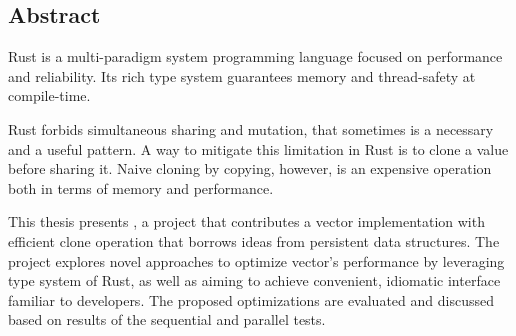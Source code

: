 \vspace*{2cm}
\thispagestyle{plain}

{}

\begin{center}
\section*{Abstract}
\end{center}

Rust is a multi-paradigm system programming language focused on performance and reliability. Its rich type system guarantees memory and thread-safety at compile-time.

Rust forbids simultaneous sharing and mutation, that sometimes is a necessary and a useful pattern. A way to mitigate this limitation in Rust is to clone a value before sharing it. Naive cloning by copying, however, is an expensive operation both in terms of memory and performance.

This thesis presents \pvecrs{}, a project that contributes a vector implementation with efficient clone operation that borrows ideas from persistent data structures. The project explores novel approaches to optimize vector’s performance by leveraging type system of Rust, as well as aiming to achieve convenient, idiomatic interface familiar to developers. The proposed optimizations are evaluated and discussed based on results of the sequential and parallel tests.
